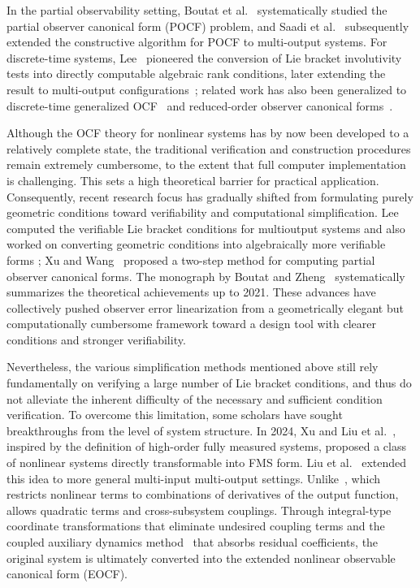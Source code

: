 \documentclass[11pt]{article}
\begin{document}
In the partial observability setting, Boutat et al.~\cite{Boutat2016Automatica} systematically studied the partial observer canonical form (POCF) problem, and Saadi et al.~\cite{Saadi2020TAC} subsequently extended the constructive algorithm for POCF to multi-output systems. For discrete-time systems, Lee~\cite{Lee2011SCL} pioneered the conversion of Lie bracket involutivity tests into directly computable algebraic rank conditions, later extending the result to multi-output configurations~\cite{Lee2017TAC}; related work has also been generalized to discrete-time generalized OCF~\cite{Hong2008SCL} and reduced-order observer canonical forms~\cite{Boutat2012SCL}.

Although the OCF theory for nonlinear systems has by now been developed to a relatively complete state, the traditional verification and construction procedures remain extremely cumbersome, to the extent that full computer implementation is challenging. This sets a high theoretical barrier for practical application. Consequently, recent research focus has gradually shifted from formulating purely geometric conditions toward verifiability and computational simplification. Lee \cite{Lee2017} computed the verifiable Lie bracket conditions for multioutput systems and also worked on converting geometric conditions into algebraically more verifiable forms \cite{Lee2011SCL,Lee2017TAC}; Xu and Wang~\cite{Xu2022IJCAS} proposed a two-step method for computing partial observer canonical forms. The monograph by Boutat and Zheng~\cite{Boutat2021Book} systematically summarizes the theoretical achievements up to 2021. These advances have collectively pushed observer error linearization from a geometrically elegant but computationally cumbersome framework toward a design tool with clearer conditions and stronger verifiability.

Nevertheless, the various simplification methods mentioned above still rely fundamentally on verifying a large number of Lie bracket conditions, and thus do not alleviate the inherent difficulty of the necessary and sufficient condition verification. To overcome this limitation, some scholars have sought breakthroughs from the level of system structure. In 2024, Xu and Liu et al.~\cite{Xu2025Distributed}, inspired by the definition of high-order fully measured systems, proposed a class of nonlinear systems directly transformable into FMS form. Liu et al.~\cite{Liu2025Nonlinear} extended this idea to more general multi-input multi-output settings. Unlike~\cite{Xu2025Distributed}, which restricts nonlinear terms to combinations of derivatives of the output function,~\cite{Liu2025Nonlinear} allows quadratic terms and cross-subsystem couplings. Through integral-type coordinate transformations that eliminate undesired coupling terms and the coupled auxiliary dynamics method~\cite{Wang2020} that absorbs residual coefficients, the original system is ultimately converted into the extended nonlinear observable canonical form (EOCF).
\end{document}
